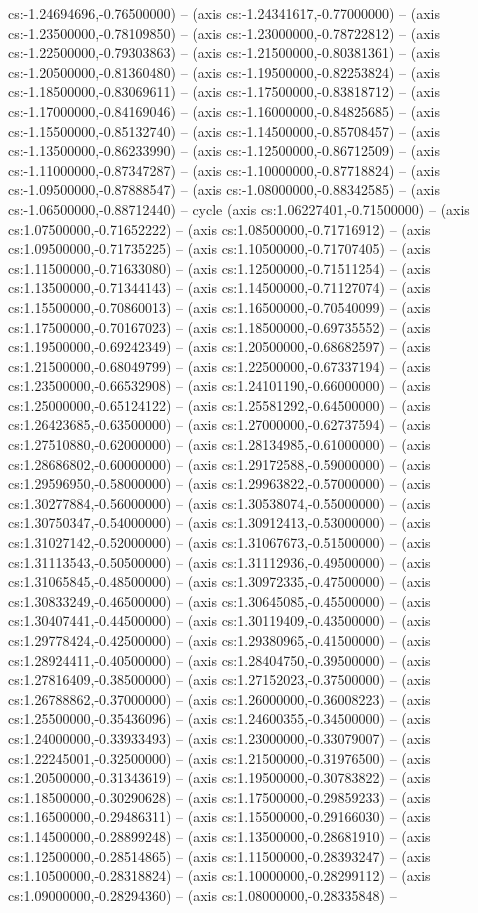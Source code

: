 cs:-1.24694696,-0.76500000) -- (axis cs:-1.24341617,-0.77000000) -- (axis cs:-1.23500000,-0.78109850) -- (axis cs:-1.23000000,-0.78722812) -- (axis cs:-1.22500000,-0.79303863) -- (axis cs:-1.21500000,-0.80381361) -- (axis cs:-1.20500000,-0.81360480) -- (axis cs:-1.19500000,-0.82253824) -- (axis cs:-1.18500000,-0.83069611) -- (axis cs:-1.17500000,-0.83818712) -- (axis cs:-1.17000000,-0.84169046) -- (axis cs:-1.16000000,-0.84825685) -- (axis cs:-1.15500000,-0.85132740) -- (axis cs:-1.14500000,-0.85708457) -- (axis cs:-1.13500000,-0.86233990) -- (axis cs:-1.12500000,-0.86712509) -- (axis cs:-1.11000000,-0.87347287) -- (axis cs:-1.10000000,-0.87718824) -- (axis cs:-1.09500000,-0.87888547) -- (axis cs:-1.08000000,-0.88342585) -- (axis cs:-1.06500000,-0.88712440) -- cycle (axis cs:1.06227401,-0.71500000) -- (axis cs:1.07500000,-0.71652222) -- (axis cs:1.08500000,-0.71716912) -- (axis cs:1.09500000,-0.71735225) -- (axis cs:1.10500000,-0.71707405) -- (axis cs:1.11500000,-0.71633080) -- (axis cs:1.12500000,-0.71511254) -- (axis cs:1.13500000,-0.71344143) -- (axis cs:1.14500000,-0.71127074) -- (axis cs:1.15500000,-0.70860013) -- (axis cs:1.16500000,-0.70540099) -- (axis cs:1.17500000,-0.70167023) -- (axis cs:1.18500000,-0.69735552) -- (axis cs:1.19500000,-0.69242349) -- (axis cs:1.20500000,-0.68682597) -- (axis cs:1.21500000,-0.68049799) -- (axis cs:1.22500000,-0.67337194) -- (axis cs:1.23500000,-0.66532908) -- (axis cs:1.24101190,-0.66000000) -- (axis cs:1.25000000,-0.65124122) -- (axis cs:1.25581292,-0.64500000) -- (axis cs:1.26423685,-0.63500000) -- (axis cs:1.27000000,-0.62737594) -- (axis cs:1.27510880,-0.62000000) -- (axis cs:1.28134985,-0.61000000) -- (axis cs:1.28686802,-0.60000000) -- (axis cs:1.29172588,-0.59000000) -- (axis cs:1.29596950,-0.58000000) -- (axis cs:1.29963822,-0.57000000) -- (axis cs:1.30277884,-0.56000000) -- (axis cs:1.30538074,-0.55000000) -- (axis cs:1.30750347,-0.54000000) -- (axis cs:1.30912413,-0.53000000) -- (axis cs:1.31027142,-0.52000000) -- (axis cs:1.31067673,-0.51500000) -- (axis cs:1.31113543,-0.50500000) -- (axis cs:1.31112936,-0.49500000) -- (axis cs:1.31065845,-0.48500000) -- (axis cs:1.30972335,-0.47500000) -- (axis cs:1.30833249,-0.46500000) -- (axis cs:1.30645085,-0.45500000) -- (axis cs:1.30407441,-0.44500000) -- (axis cs:1.30119409,-0.43500000) -- (axis cs:1.29778424,-0.42500000) -- (axis cs:1.29380965,-0.41500000) -- (axis cs:1.28924411,-0.40500000) -- (axis cs:1.28404750,-0.39500000) -- (axis cs:1.27816409,-0.38500000) -- (axis cs:1.27152023,-0.37500000) -- (axis cs:1.26788862,-0.37000000) -- (axis cs:1.26000000,-0.36008223) -- (axis cs:1.25500000,-0.35436096) -- (axis cs:1.24600355,-0.34500000) -- (axis cs:1.24000000,-0.33933493) -- (axis cs:1.23000000,-0.33079007) -- (axis cs:1.22245001,-0.32500000) -- (axis cs:1.21500000,-0.31976500) -- (axis cs:1.20500000,-0.31343619) -- (axis cs:1.19500000,-0.30783822) -- (axis cs:1.18500000,-0.30290628) -- (axis cs:1.17500000,-0.29859233) -- (axis cs:1.16500000,-0.29486311) -- (axis cs:1.15500000,-0.29166030) -- (axis cs:1.14500000,-0.28899248) -- (axis cs:1.13500000,-0.28681910) -- (axis cs:1.12500000,-0.28514865) -- (axis cs:1.11500000,-0.28393247) -- (axis cs:1.10500000,-0.28318824) -- (axis cs:1.10000000,-0.28299112) -- (axis cs:1.09000000,-0.28294360) -- (axis cs:1.08000000,-0.28335848) -- 
